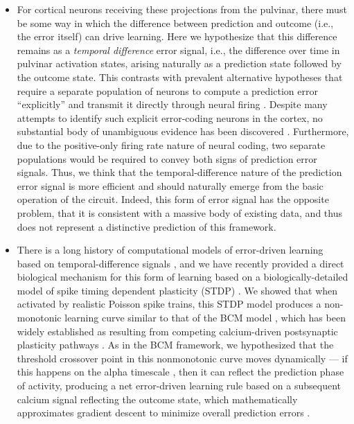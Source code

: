 \documentclass[11pt,twoside]{article}
\newif\myifpdf
\begin{document}
\begin{itemize}
	\item For cortical neurons receiving these projections from the pulvinar, there must be some way in which the difference between prediction and outcome (i.e., the error itself) can drive learning.  Here we hypothesize that this difference remains as a \emph{temporal difference} error signal, i.e., the difference over time in pulvinar activation states, arising naturally as a prediction state followed by the outcome state.  This contrasts with prevalent alternative hypotheses that require a separate population of neurons to compute a prediction error ``explicitly'' and transmit it directly through neural firing \cite{RaoBallard99,KawatoHayakawaInui93,Friston05,Friston10,OudenKokLange12,LotterKreimanCox16}.  Despite many attempts to identify such explicit error-coding neurons in the cortex, no substantial body of unambiguous evidence has been discovered \cite{KokLange15,KokJeheedeLange12,SummerfieldEgner09,LeeMumford03,WalshMcGovernClarkEtAl20}.  Furthermore, due to the positive-only firing rate nature of neural coding, two separate populations would be required to convey both signs of prediction error signals.  Thus, we think that the temporal-difference nature of the prediction error signal is more efficient and should naturally emerge from the basic operation of the circuit.  Indeed, this form of error signal has the opposite problem, that it is consistent with a massive body of existing data, and thus does not represent a distinctive prediction of this framework.
	\item There is a long history of computational models of error-driven learning based on temporal-difference signals \cite{AckleyHintonSejnowski85,OReilly96}, and we have recently provided a direct biological mechanism for this form of learning based on a biologically-detailed model of spike timing dependent plasticity (STDP) \cite{UrakuboHondaFroemkeEtAl08}.  We showed that when activated by realistic Poisson spike trains, this STDP model produces a non-monotonic learning curve similar to that of the BCM model \cite{BienenstockCooperMunro82}, which has been widely established as resulting from competing calcium-driven postsynaptic plasticity pathways \cite{LuscherMalenka12}.  As in the BCM framework, we hypothesized that the threshold crossover point in this nonmonotonic curve moves dynamically --- if this happens on the alpha timescale \cite{LimMcKeeWoloszynEtAl15}, then it can reflect the prediction phase of activity, producing a net error-driven learning rule based on a subsequent calcium signal reflecting the outcome state, which mathematically approximates gradient descent to minimize overall prediction errors \cite{OReilly96}.
\end{itemize}
\end{document}
